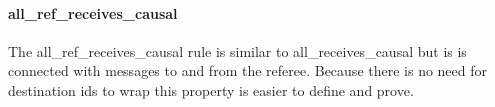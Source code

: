 \documentclass[runningheads]{llncs}
\begin{document}
\paragraph{all\_ref\_receives\_causal}
The all\_ref\_receives\_causal rule is similar to all\_receives\_causal but is is connected with messages to and from the referee. Because there is no need for destination ids to wrap this property is easier to define and prove. 



\end{document}
